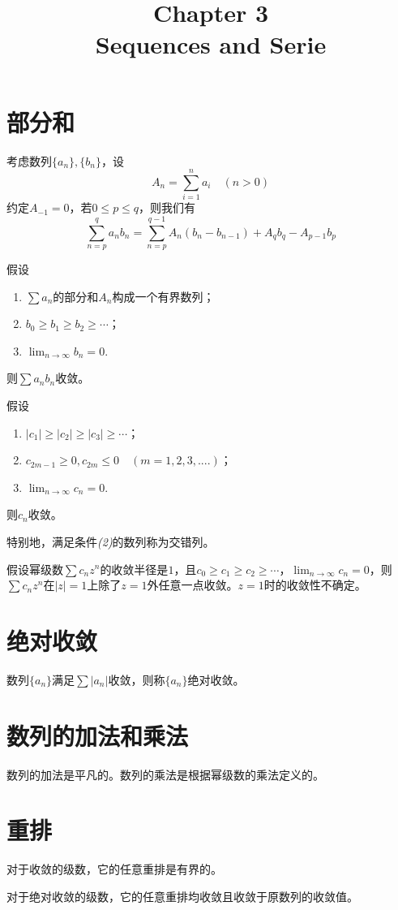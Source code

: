 \documentclass{article}
\title{
\Huge \textbf{Chapter 3}
\\
Sequences and Serie}
\author{}
\date{}
\newcommand{\ra}{\rightarrow}
\newcommand{\ds}{\displaystyle}
\begin{document}
\maketitle

\section{部分和}
\begin{theorem}
    考虑数列\(\{a_n\},\{b_n\}\)，设\[
    A_n = \sum_{i=1} ^n  a_i \quad(n>0)
    \]约定\(A_{-1} =0\)，若\(0\leq p\leq  q\)，则我们有\[
    \sum_{n=p}^q a_nb_n =\sum_{n=p}^{q-1}A_n (b_n-b_{n-1})+A_qb_q-A_{p-1}b_p
    \]
\end{theorem}

\begin{theorem}
    假设\begin{enumerate}[label=(\arabic*)]
        \item \(\sum a_n\)的部分和\(A_n\)构成一个有界数列；
        \item \(b_0\geq b_1\geq b_2\geq \cdots \)；
        \item \(\ds \lim _{n\ra \infty} b_n =0\).
    \end{enumerate}
    则\(\sum a_nb_n\)收敛。
\end{theorem}

\begin{theorem}
    假设\begin{enumerate}[label=(\arabic*)]
        \item \(|c_1|\geq |c_2|\geq |c_3|\geq \cdots\)；
        \item \(c_{2m-1}\geq 0,c_{2m}\leq 0\quad(m=1,2,3,....)\)；
        \item \(\ds \lim_{n\ra \infty }c_n = 0\).
    \end{enumerate}
    则\(c_n \)收敛。
\end{theorem}

特别地，满足条件{\it (2)}的数列称为交错列。

\begin{theorem}
    假设幂级数\(\sum c_n z^n\)的收敛半径是\(1\)，且\(c_0\geq c_1\geq c_2\geq\cdots\)，\(\ds\lim_{n\ra \infty}c_n=0\)，则\(\sum c_nz^n\)在\(|z|=1\)上除了\(z=1\)外任意一点收敛。\(z=1\)时的收敛性不确定。
\end{theorem}

\section{绝对收敛}
\begin{definition}
    数列\(\{a_n\}\)满足\( \sum |a_n|\)收敛，则称\(\{a_n\}\)绝对收敛。
\end{definition}
\section{数列的加法和乘法}
数列的加法是平凡的。数列的乘法是根据幂级数的乘法定义的。

\section{重排}
\begin{theorem}
    对于收敛的级数，它的任意重排是有界的。
\end{theorem}

\begin{theorem}
    对于绝对收敛的级数，它的任意重排均收敛且收敛于原数列的收敛值。
\end{theorem}
\end{document}
